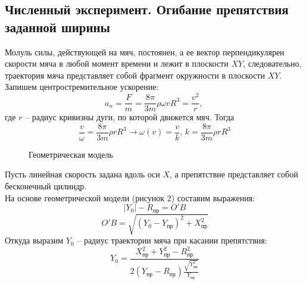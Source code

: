 \documentclass[a5paper, 10pt]{article}
\theoremstyle{definition}
\theoremstyle{plain}
\theoremstyle{remark}
\begin{document}
\subsection{Численный эксперимент. Огибание препятствия заданной ширины}
Молуль силы, действующей на мяч, постоянен, а ее вектор перпендикулярен скорости мяча в любой момент времени и лежит в плоскости $XY$, следовательно, траектория мяча представляет собой фрагмент окружности в плоскости  $XY$. \\
Запишем центростремительное ускорение:
\begin{equation}
a_n = \frac{F}{m} = \frac{8\pi}{3m} \rho \omega v R^3 = \frac{v^2}{r}, \,
\end{equation}
где $r$ -- радиус кривизны дуги, по которой движется мяч. Тогда
\begin{equation}
\frac{v}{\omega} =  \frac{8\pi}{3m} \rho r R^3 \to \omega (v) = \frac{v}{k}, \, k =  \frac{8\pi}{3m} \rho r R^3
\end{equation}
\begin{figure}[!h]
	           \caption{Геометрическая модель}
\end{figure}
Пусть линейная скорость задана вдоль оси $X$, а препятствие представляет собой бесконечный цилиндр.\\
На основе геометрической модели (рисунок 2) составим выражения:
\begin{equation}
|Y_0| - R_{\text{пр}} = O'B 
\end{equation}
\begin{equation}
O'B = \sqrt{\left( Y_0 - Y_{\text{пр}} \right)^2 + X_{\text{пр}}^2} 
\end{equation}
Откуда выразим $Y_0$ -- радиус траектории мяча при касании препятствия:
\begin{equation}
Y_0 = \frac{X_{\text{пр}}^2 +  Y_{\text{пр}}^2 - R_{\text{пр}}^2 }{2 \left(  Y_{\text{пр}} - R_{\text{пр}} \right) \frac{\sqrt{ Y_{\text{пр}}^2}}{ Y_{\text{пр}}}}
\end{equation}
\end{document}
